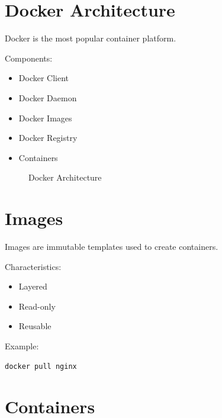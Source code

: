 \section{Docker Architecture}

Docker is the most popular container platform.

Components:

\begin{itemize}
\item Docker Client
\item Docker Daemon
\item Docker Images
\item Docker Registry
\item Containers
\end{itemize}

\begin{figure}[H]
\centering
{}
\caption{Docker Architecture}
\end{figure}

\section{Images}

Images are immutable templates used to create containers.

Characteristics:

\begin{itemize}
\item Layered
\item Read-only
\item Reusable
\end{itemize}

Example:

\begin{lstlisting}[style=interviewcode]
docker pull nginx
\end{lstlisting}

\section{Containers}

